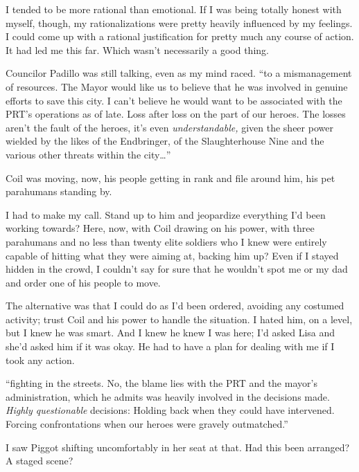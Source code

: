 I tended to be more rational than emotional.  If I was being totally honest with myself, though, my rationalizations were pretty heavily influenced by my feelings.  I could come up with a rational justification for pretty much any course of action.  It had led me this far.  Which wasn't necessarily a good thing.



Councilor Padillo was still talking, even as my mind raced.  ``\ldotsPoints to a mismanagement of resources.  The Mayor would like us to believe that he was involved in genuine efforts to save this city.  I can't believe he would want to be associated with the PRT's operations as of late.  Loss after loss on the part of our heroes.  The losses aren't the fault of the heroes, it's even \emph{understandable, }given the sheer power wielded by the likes of the Endbringer, of the Slaughterhouse Nine and the various other threats within the city\ldots''



Coil was moving, now, his people getting in rank and file around him, his pet parahumans standing by.



I had to make my call.  Stand up to him and jeopardize everything I'd been working towards?  Here, now, with Coil drawing on his power, with three parahumans and no less than twenty elite soldiers who I knew were entirely capable of hitting what they were aiming at, backing him up?  Even if I stayed hidden in the crowd, I couldn't say for sure that he wouldn't spot me or my dad and order one of his people to move.



The alternative was that I could do as I'd been ordered, avoiding any costumed activity; trust Coil and his power to handle the situation.  I hated him, on a level, but I knew he was smart.  And I knew he knew I was here; I'd asked Lisa and she'd asked him if it was okay.  He had to have a plan for dealing with me if I took any action.



``\ldotsOpen fighting in the streets.  No, the blame lies with the PRT and the mayor's administration, which he admits was heavily involved in the decisions made.  \emph{Highly questionable} decisions:  Holding back when they could have intervened.  Forcing confrontations when our heroes were gravely outmatched.''



I saw Piggot shifting uncomfortably in her seat at that.  Had this been arranged?  A staged scene?



